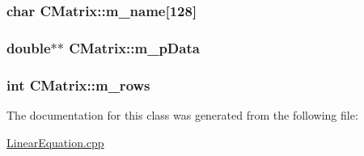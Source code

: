 \subsubsection[{\texorpdfstring{m\+\_\+name}{m_name}}]{\setlength{\rightskip}{0pt plus 5cm}char C\+Matrix\+::m\+\_\+name\mbox{[}128\mbox{]}\hspace{0.3cm}{\ttfamily [private]}}\hypertarget{classCMatrix_aecd316cc4360014e817f7dc763aaa957}{}\label{classCMatrix_aecd316cc4360014e817f7dc763aaa957}
\subsubsection[{\texorpdfstring{m\+\_\+p\+Data}{m_pData}}]{\setlength{\rightskip}{0pt plus 5cm}double$\ast$$\ast$ C\+Matrix\+::m\+\_\+p\+Data}\hypertarget{classCMatrix_ab0f18d68cad9b6d750d05a96b60a759d}{}\label{classCMatrix_ab0f18d68cad9b6d750d05a96b60a759d}
\subsubsection[{\texorpdfstring{m\+\_\+rows}{m_rows}}]{\setlength{\rightskip}{0pt plus 5cm}int C\+Matrix\+::m\+\_\+rows\hspace{0.3cm}{\ttfamily [private]}}\hypertarget{classCMatrix_ae23e5f8016ba06cfd1cce364a99f5037}{}\label{classCMatrix_ae23e5f8016ba06cfd1cce364a99f5037}


The documentation for this class was generated from the following file\+:\begin{DoxyCompactItemize}
\item 
\hyperlink{LinearEquation_8cpp}{Linear\+Equation.\+cpp}\end{DoxyCompactItemize}
